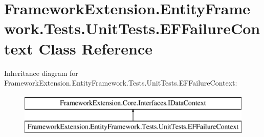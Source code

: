 \hypertarget{class_framework_extension_1_1_entity_framework_1_1_tests_1_1_unit_tests_1_1_e_f_failure_context}{\section{Framework\-Extension.\-Entity\-Framework.\-Tests.\-Unit\-Tests.\-E\-F\-Failure\-Context Class Reference}
\label{class_framework_extension_1_1_entity_framework_1_1_tests_1_1_unit_tests_1_1_e_f_failure_context}
}
Inheritance diagram for Framework\-Extension.\-Entity\-Framework.\-Tests.\-Unit\-Tests.\-E\-F\-Failure\-Context\-:\begin{figure}[H]
\begin{center}
\leavevmode
\includegraphics[height=2.000000cm]{class_framework_extension_1_1_entity_framework_1_1_tests_1_1_unit_tests_1_1_e_f_failure_context}
\end{center}
\end{figure}

